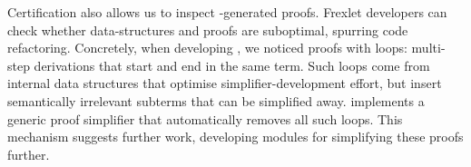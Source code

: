 Certification also allows us to inspect \Frexlib{}-generated proofs.
%
Frexlet developers can check whether data-structures and
proofs are suboptimal, spurring code refactoring.
%
Concretely, when developing \Frexlib{}, we noticed proofs with loops:
multi-step derivations that start and end in the same term.
%
Such loops come from internal data structures that optimise
simplifier-development effort, but insert semantically irrelevant
subterms that can be simplified away.
%
\Frexlib{} implements a generic proof simplifier that automatically removes
all such loops.
%
This mechanism suggests further work, developing
modules for simplifying these proofs further.
